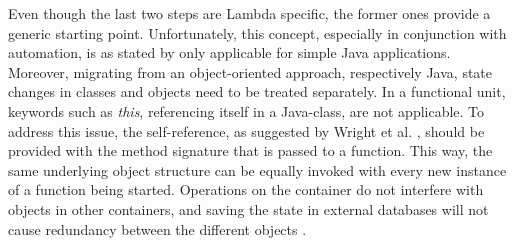 \documentclass[a4paper,11pt, pagesize]{scrartcl}
\begin{document}
\begin{spacing}{1.2}
Even though the last two steps are Lambda specific, the former ones provide a generic starting point. Unfortunately, this concept, especially in conjunction with automation, is as stated by \cite{spillner2017Java} only applicable for simple Java applications. Moreover, migrating from an object-oriented approach, respectively Java, state changes in classes and objects need to be treated separately. In a functional unit, keywords such as \textit{this}, referencing itself in a Java-class, are not applicable. To address this issue, the self-reference, as suggested by Wright et al. \cite{wright1998compiling}, should be provided with the method signature that is passed to a function. This way, the same underlying object structure can be equally invoked with every new instance of a function being started. Operations on the container do not interfere with objects in other containers, and saving the state in external databases will not cause redundancy between the different objects \cite{spillner2017Java}.\\\\ 

\end{spacing}
\end{document}
